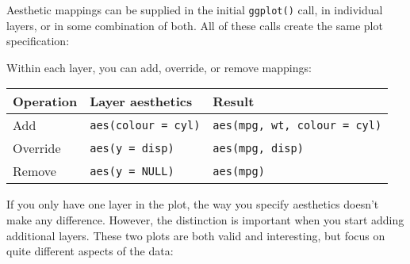Aesthetic mappings can be supplied in the initial \texttt{ggplot()}
call, in individual layers, or in some combination of both. All of these
calls create the same plot specification:

\begin{Shaded}
\begin{Highlighting}[]
 \StringTok{ }
\StringTok{  }\NormalTok{()}
\StringTok{ }
\StringTok{  }\NormalTok{(}\NormalTok{(} 
\StringTok{ }
\StringTok{  }\NormalTok{(}\NormalTok{(}  
\StringTok{ }
\StringTok{  }\NormalTok{(} 
\end{Highlighting}
\end{Shaded}

Within each layer, you can add, override, or remove mappings:

\begin{longtable}[c]{@{}lll@{}}
\toprule
Operation & Layer aesthetics & Result\tabularnewline
\midrule
\endhead
Add & \texttt{aes(colour\ =\ cyl)} &
\texttt{aes(mpg,\ wt,\ colour\ =\ cyl)}\tabularnewline
Override & \texttt{aes(y\ =\ disp)} &
\texttt{aes(mpg,\ disp)}\tabularnewline
Remove & \texttt{aes(y\ =\ NULL)} & \texttt{aes(mpg)}\tabularnewline
\bottomrule
\end{longtable}

If you only have one layer in the plot, the way you specify aesthetics
doesn't make any difference. However, the distinction is important when
you start adding additional layers. These two plots are both valid and
interesting, but focus on quite different aspects of the data:

